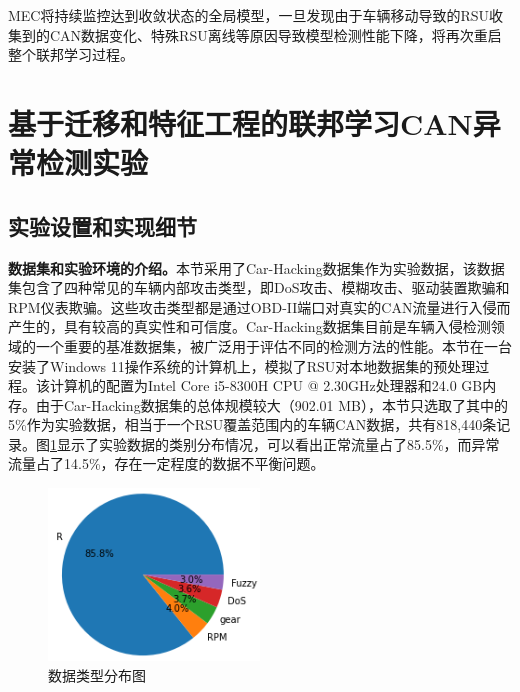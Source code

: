 MEC将持续监控达到收敛状态的全局模型，一旦发现由于车辆移动导致的RSU收集到的CAN数据变化、特殊RSU离线等原因导致模型检测性能下降，将再次重启整个联邦学习过程。

\section{基于迁移和特征工程的联邦学习CAN异常检测实验}

\subsection{实验设置和实现细节}

\textbf{数据集和实验环境的介绍。}\label{subsection:Dataset_and_experimental_environment}本节采用了Car-Hacking数据集作为实验数据，该数据集包含了四种常见的车辆内部攻击类型，即DoS攻击、模糊攻击、驱动装置欺骗和RPM仪表欺骗。这些攻击类型都是通过OBD-II端口对真实的CAN流量进行入侵而产生的，具有较高的真实性和可信度。Car-Hacking数据集目前是车辆入侵检测领域的一个重要的基准数据集，被广泛用于评估不同的检测方法的性能。本节在一台安装了Windows 11操作系统的计算机上，模拟了RSU对本地数据集的预处理过程。该计算机的配置为Intel Core i5-8300H CPU @ 2.30GHz处理器和24.0 GB内存。由于Car-Hacking数据集的总体规模较大（902.01 MB），本节只选取了其中的5\%作为实验数据，相当于一个RSU覆盖范围内的车辆CAN数据，共有818,440条记录。图\ref{fig:data type distribution}显示了实验数据的类别分布情况，可以看出正常流量占了85.5\%，而异常流量占了14.5\%，存在一定程度的数据不平衡问题。

\begin{figure}[htb]
    \centering
    \includegraphics[width=0.50\textwidth]{figures/Data type distribution.png}
    \caption{数据类型分布图}
    \label{fig:data type distribution}
\end{figure} 


